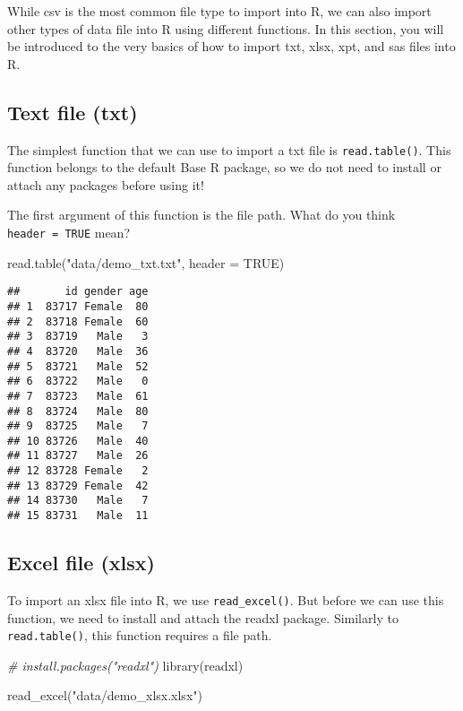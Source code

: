 \documentclass[
]{book}
\newenvironment{Shaded}{\begin{snugshade}}{\end{snugshade}}
\newcommand{\AttributeTok}[1]{\textcolor[rgb]{0.77,0.63,0.00}{#1}}
\newcommand{\CommentTok}[1]{\textcolor[rgb]{0.56,0.35,0.01}{\textit{#1}}}
\newcommand{\ConstantTok}[1]{\textcolor[rgb]{0.00,0.00,0.00}{#1}}
\newcommand{\FunctionTok}[1]{\textcolor[rgb]{0.00,0.00,0.00}{#1}}
\newcommand{\NormalTok}[1]{#1}
\newcommand{\StringTok}[1]{\textcolor[rgb]{0.31,0.60,0.02}{#1}}
\begin{document}
While csv is the most common file type to import into R, we can also import other types of data file into R using different functions. In this section, you will be introduced to the very basics of how to import txt, xlsx, xpt, and sas files into R.

\hypertarget{text-file-txt}{%
\subsection{Text file (txt)}\label{text-file-txt}}

The simplest function that we can use to import a txt file is \texttt{read.table()}. This function belongs to the default Base R package, so we do not need to install or attach any packages before using it!

The first argument of this function is the file path. What do you think \texttt{header\ =\ TRUE} mean?

\begin{Shaded}
\begin{Highlighting}[]
\FunctionTok{read.table}\NormalTok{(}\StringTok{"data/demo\_txt.txt"}\NormalTok{, }\AttributeTok{header =} \ConstantTok{TRUE}\NormalTok{)}
\end{Highlighting}
\end{Shaded}

\begin{verbatim}
##       id gender age
## 1  83717 Female  80
## 2  83718 Female  60
## 3  83719   Male   3
## 4  83720   Male  36
## 5  83721   Male  52
## 6  83722   Male   0
## 7  83723   Male  61
## 8  83724   Male  80
## 9  83725   Male   7
## 10 83726   Male  40
## 11 83727   Male  26
## 12 83728 Female   2
## 13 83729 Female  42
## 14 83730   Male   7
## 15 83731   Male  11
\end{verbatim}

\hypertarget{excel-file-xlsx}{%
\subsection{Excel file (xlsx)}\label{excel-file-xlsx}}

To import an xlsx file into R, we use \texttt{read\_excel()}. But before we can use this function, we need to install and attach the readxl package. Similarly to \texttt{read.table()}, this function requires a file path.

\begin{Shaded}
\begin{Highlighting}[]
\CommentTok{\# install.packages("readxl")}
\FunctionTok{library}\NormalTok{(readxl)}

\FunctionTok{read\_excel}\NormalTok{(}\StringTok{"data/demo\_xlsx.xlsx"}\NormalTok{)}
\end{Highlighting}
\end{Shaded}
\end{document}
